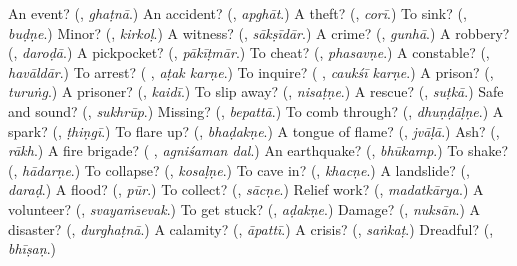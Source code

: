 \begin{tcolorbox}[breakable,colback=teal!4,colframe=teal!35!black,title={Before you move on}]
An event? (\textbf{}, \emph{ghaṭnā}.) An accident? (\textbf{}, \emph{apghāt}.) A theft? (\textbf{}, \emph{corī}.) To sink? (\textbf{}, \emph{buḍṇe}.) Minor? (\textbf{}, \emph{kirkoḷ}.) A witness? (\textbf{}, \emph{sākṣīdār}.) A crime? (\textbf{}, \emph{gunhā}.) A robbery? (\textbf{}, \emph{daroḍā}.) A pickpocket? (\textbf{}, \emph{pākīṭmār}.) To cheat? (\textbf{}, \emph{phasavṇe}.) A constable? (\textbf{}, \emph{havāldār}.) To arrest? (\textbf{ }, \emph{aṭak karṇe}.) To inquire? (\textbf{ }, \emph{caukśī karṇe}.) A prison? (\textbf{}, \emph{turuṅg}.) A prisoner? (\textbf{}, \emph{kaidī}.) To slip away? (\textbf{}, \emph{nisaṭṇe}.) A rescue? (\textbf{}, \emph{suṭkā}.) Safe and sound? (\textbf{}, \emph{sukhrūp}.) Missing? (\textbf{}, \emph{bepattā}.) To comb through? (\textbf{}, \emph{dhuṇḍāḷṇe}.) A spark? (\textbf{}, \emph{ṭhiṇgī}.) To flare up? (\textbf{}, \emph{bhaḍakṇe}.) A tongue of flame? (\textbf{}, \emph{jvāḷā}.) Ash? (\textbf{}, \emph{rākh}.) A fire brigade? (\textbf{ }, \emph{agniśaman dal}.) An earthquake? (\textbf{}, \emph{bhūkamp}.) To shake? (\textbf{}, \emph{hādarṇe}.) To collapse? (\textbf{}, \emph{kosaḷṇe}.) To cave in? (\textbf{}, \emph{khacṇe}.) A landslide? (\textbf{}, \emph{daraḍ}.) A flood? (\textbf{}, \emph{pūr}.) To collect? (\textbf{}, \emph{sācṇe}.) Relief work? (\textbf{}, \emph{madatkārya}.) A volunteer? (\textbf{}, \emph{svayaṁsevak}.) To get stuck? (\textbf{}, \emph{aḍakṇe}.) Damage? (\textbf{}, \emph{nuksān}.) A disaster? (\textbf{}, \emph{durghaṭnā}.) A calamity? (\textbf{}, \emph{āpattī}.) A crisis? (\textbf{}, \emph{saṅkaṭ}.) Dreadful? (\textbf{}, \emph{bhīṣaṇ}.)
\end{tcolorbox}
